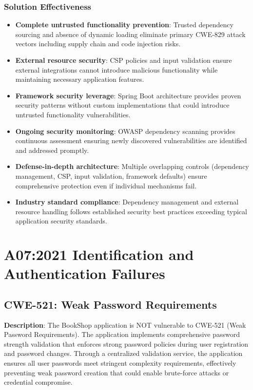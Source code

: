 \documentclass[]{UCD_CS_FYP_Report}
\begin{document}
\subsection{Solution Effectiveness}
\begin{itemize}
	\item \textbf{Complete untrusted functionality prevention}: Trusted dependency sourcing and absence of dynamic loading eliminate primary CWE-829 attack vectors including supply chain and code injection risks.
	\item \textbf{External resource security}: CSP policies and input validation ensure external integrations cannot introduce malicious functionality while maintaining necessary application features.
	\item \textbf{Framework security leverage}: Spring Boot architecture provides proven security patterns without custom implementations that could introduce untrusted functionality vulnerabilities.
	\item \textbf{Ongoing security monitoring}: OWASP dependency scanning provides continuous assessment ensuring newly discovered vulnerabilities are identified and addressed promptly.
	\item \textbf{Defense-in-depth architecture}: Multiple overlapping controls (dependency management, CSP, input validation, framework defaults) ensure comprehensive protection even if individual mechanisms fail.
	\item \textbf{Industry standard compliance}: Dependency management and external resource handling follows established security best practices exceeding typical application security standards.
\end{itemize}



\chapter{A07:2021 Identification and Authentication Failures}


\section{CWE-521: Weak Password Requirements}

\textbf{Description}: The BookShop application is NOT vulnerable to CWE-521 (Weak Password Requirements). The application implements comprehensive password strength validation that enforces strong password policies during user registration and password changes. Through a centralized validation service, the application ensures all user passwords meet stringent complexity requirements, effectively preventing weak password creation that could enable brute-force attacks or credential compromise.
\end{document}
